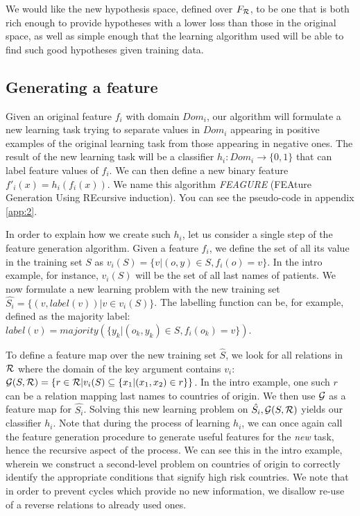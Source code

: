 \documentclass[twoside,11pt]{article}
\theoremstyle{definition}
\begin{document}
We would like the new hypothesis space, defined over $F_{\cal R}$, to be one that is both rich enough to provide hypotheses with a lower loss than those in the original space, as well as simple enough that the learning algorithm used will be able to find such good hypotheses given training data.

\subsection{Generating a feature} \label{algorithm_section}

Given an original feature $f_{i}$ with domain $Dom_i$, our algorithm will formulate a new learning task trying to separate values in $Dom_i$ appearing in positive examples of the original learning task from those appearing in negative ones.  The result of the new learning task will be a classifier
$h_{i}:Dom_{i}\rightarrow \{0,1\}$ that can label feature values of $f_{i}$. We can then define a new binary feature $f'_{i}(x)=h_{i}(f_{i}(x))$.
We name this algorithm \emph{FEAGURE} (FEAture Generation Using REcursive induction). You can see the pseudo-code in appendix \ref{app:2}.

In order to explain how we create such $h_{i}$, let us consider a single step of the feature generation algorithm.
Given a feature $f_{i}$, we define the set of all its value in the training set $S$ as $v_i(S) = \{v | (o,y) \in S, f_{i}(o)=v\}$. In the intro example, for instance, $v_i(S)$ will be the set of all last names of patients.
We now formulate a new learning problem with the new training set
$\hat{S_i} = \{ (v, label(v)) | v \in v_i(S) \}$.
The labelling function can be, for example, defined as
the majority label: $label(v)=majority(\{y_k| \left(o_k,y_k \right) \in S, f_{i}(o_k)=v\})$.

To define a feature map over the new training set $\hat{S}$, we look for all relations in $\cal R$ where the domain of the key argument contains $v_i$:
${\cal G}(S,{\cal R}) = \left\{ r \in {\cal R} | v_i(S) \subseteq \{x_1 | (x_1,x_2) \in r\}\right\}$. In the intro example, one such $r$ can be a relation mapping last names to countries of origin. We then use ${\cal G}$ as a feature map for $\hat{S_i}$.
Solving this new learning problem on $\hat{S_i}, {\cal G}(S,{\cal R})$ yields our classifier $h_{i}$.
Note that during the process of learning $h_{i}$, we can once again call the feature generation procedure to generate useful features for the \emph{new} task, hence the recursive aspect of the process. We can see this in the intro example, wherein we construct a second-level problem on countries of origin to correctly identify the appropriate conditions that signify high risk countries.
We note that in order to prevent cycles which provide no new information, we disallow re-use of a reverse relations to already used ones.
\end{document}
